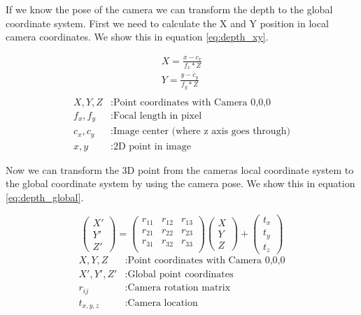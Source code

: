 \documentclass[11pt,a4paper,titlepage,oneside]{report}
\begin{document}
If we know the pose of the camera we can transform the depth to the global coordinate system. First we need to calculate the X and Y position in local camera coordinates. We show this in equation \ref{eq:depth_xy}.

\begin{equation}\label{eq:depth_xy}
  \begin{gathered}
    X = \frac{x-c_x}{f_x*Z}\\
    Y = \frac{y-c_y}{f_y*Z}\\
  \end{gathered}
\end{equation}
\begin{align*}
  X,Y,Z    &: \text{Point coordinates with Camera 0,0,0}\\
  f_x,f_y  &: \text{Focal length in pixel}\\
  c_x,c_y  &: \text{Image center (where z axis goes through)}\\
  x,y      &: \text{2D point in image}
\end{align*}

Now we can transform the 3D point from the cameras local coordinate system to the global coordinate system by using the camera pose. We show this in equation \ref{eq:depth_global}.

\begin{equation}\label{eq:depth_global}
  \begin{pmatrix}
    X'\\
    Y'\\
    Z'
  \end{pmatrix}=
  \begin{pmatrix}
    r_{11} & r_{12} & r_{13}\\
    r_{21} & r_{22} & r_{23}\\
    r_{31} & r_{32} & r_{33}\\
  \end{pmatrix}
  \begin{pmatrix}
    X\\
    Y\\
    Z
  \end{pmatrix}
  +\begin{pmatrix}
    t_x\\
    t_y\\
    t_z
  \end{pmatrix}
\end{equation}
\begin{align*}
  X,Y,Z      &: \text{Point coordinates with Camera 0,0,0}\\
  X',Y',Z'  &: \text{Global point coordinates}\\
  r_{ij}    &: \text{Camera rotation matrix}\\
  t_{x,y,z}  &: \text{Camera location}
\end{align*}
\end{document}
